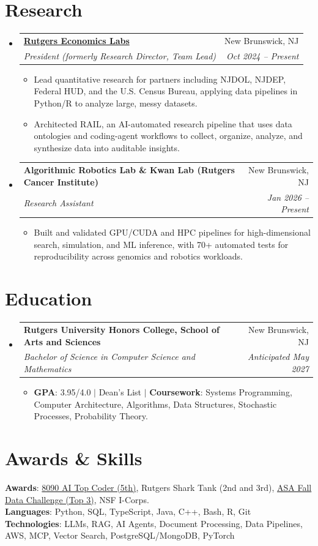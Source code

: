 \documentclass[letterpaper,11pt]{article}
\makeatletter
\newcommand{\resumeItem}[1]{
  \item\small{
    {#1 \vspace{-2pt}}
  }
}
\newcommand{\resumeSubheading}[4]{
  \vspace{-2pt}\item
    \begin{tabular*}{0.97\textwidth}[t]{l@{\extracolsep{\fill}}r}
      \textbf{#1} & #2 \\
      \textit{\small#3} & \textit{\small #4} \\
    \end{tabular*}\vspace{-7pt}
}
\newcommand{\resumeSubHeadingListStart}{\begin{itemize}[leftmargin=0.15in, label={}]}
\newcommand{\resumeSubHeadingListEnd}{\end{itemize}}
\newcommand{\resumeItemListStart}{\begin{itemize}}
\newcommand{\resumeItemListEnd}{\end{itemize}\vspace{-5pt}}
\makeatother
\begin{document}
\section{Research}
  \resumeSubHeadingListStart
  \resumeSubheading
      {\href{https://rutgerseconomics.org}{Rutgers Economics Labs}}{New Brunswick, NJ}
      {President (formerly Research Director, Team Lead)}{Oct 2024 -- Present}
      \resumeItemListStart
        \resumeItem{Lead quantitative research for partners including NJDOL, NJDEP, Federal HUD, and the U.S. Census Bureau, applying data pipelines in Python/R to analyze large, messy datasets.}
        \resumeItem{Architected RAIL, an AI-automated research pipeline that uses data ontologies and coding-agent workflows to collect, organize, analyze, and synthesize data into auditable insights.}
      \resumeItemListEnd
    \resumeSubheading
      {Algorithmic Robotics Lab \& Kwan Lab (Rutgers Cancer Institute)}{New Brunswick, NJ}
      {Research Assistant}{Jan 2026 -- Present}
      \resumeItemListStart
        \resumeItem{Built and validated GPU/CUDA and HPC pipelines for high-dimensional search, simulation, and ML inference, with 70+ automated tests for reproducibility across genomics and robotics workloads.}
      \resumeItemListEnd
  \resumeSubHeadingListEnd
\section{Education}
  \resumeSubHeadingListStart
    \resumeSubheading
      {Rutgers University Honors College, School of Arts and Sciences}{New Brunswick, NJ}
      {Bachelor of Science in Computer Science and Mathematics}{Anticipated May 2027}
      \resumeItemListStart
        \resumeItem{\textbf{GPA}: 3.95/4.0 $|$ Dean's List $|$ \textbf{Coursework}: Systems Programming, Computer Architecture, Algorithms, Data Structures, Stochastic Processes, Probability Theory.}
      \resumeItemListEnd
  \resumeSubHeadingListEnd
\section{Awards \& Skills}
 \begin{itemize}[leftmargin=0.15in, label={}]
    \small{\item{
     \textbf{Awards}{: \href{https://github.com/AkeBoss-tech/top-coder-challenge}{8090 AI Top Coder (5th)}, Rutgers Shark Tank (2nd and 3rd), \href{https://acashmoney.biz/portfolio/asa-fall-data/}{ASA Fall Data Challenge (Top 3)}, NSF I-Corps.} \\
     \textbf{Languages}{: Python, SQL, TypeScript, Java, C++, Bash, R, Git} \\
     \textbf{Technologies}{: LLMs, RAG, AI Agents, Document Processing, Data Pipelines, AWS, MCP, Vector Search, PostgreSQL/MongoDB, PyTorch}
    }}
 \end{itemize}
\end{document}
